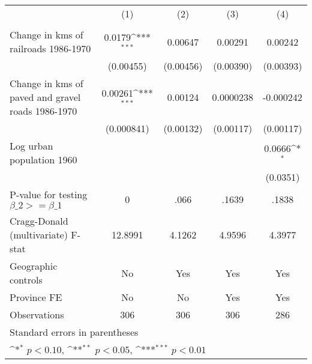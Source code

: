 {
\def\sym#1{\ifmmode^{#1}\else\(^{#1}\)\fi}
\begin{tabular}{l*{4}{c}}
\hline\hline
                &\multicolumn{1}{c}{(1)}&\multicolumn{1}{c}{(2)}&\multicolumn{1}{c}{(3)}&\multicolumn{1}{c}{(4)}\\
                &\multicolumn{1}{c}{}&\multicolumn{1}{c}{}&\multicolumn{1}{c}{}&\multicolumn{1}{c}{}\\
\hline
Change in kms of railroads 1986-1970&   0.0179\sym{***}&  0.00647         &  0.00291         &  0.00242         \\
                &(0.00455)         &(0.00456)         &(0.00390)         &(0.00393)         \\
[1em]
Change in kms of paved and gravel roads 1986-1970&  0.00261\sym{***}&  0.00124         &0.0000238         &-0.000242         \\
                &(0.000841)         &(0.00132)         &(0.00117)         &(0.00117)         \\
[1em]
Log urban population 1960&                  &                  &                  &   0.0666\sym{*}  \\
                &                  &                  &                  & (0.0351)         \\
\hline
P-value for testing $\beta\_{2} >= \beta\_{1}$&        0         &     .066         &    .1639         &    .1838         \\
Cragg-Donald (multivariate) F-stat&  12.8991         &   4.1262         &   4.9596         &   4.3977         \\
Geographic controls&       No         &      Yes         &      Yes         &      Yes         \\
Province FE     &       No         &       No         &      Yes         &      Yes         \\
Observations    &      306         &      306         &      306         &      286         \\
\hline\hline
\multicolumn{5}{l}{\footnotesize Standard errors in parentheses}\\
\multicolumn{5}{l}{\footnotesize \sym{*} \(p<0.10\), \sym{**} \(p<0.05\), \sym{***} \(p<0.01\)}\\
\end{tabular}
}
